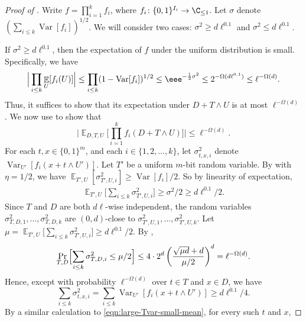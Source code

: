 \documentclass{toc}
\newcommand{\zo}{\{0,1\}}
\def\Blocklength{\ell}
\DeclareMathOperator*{\E}{\mathbb{E}}                 %
\DeclareMathOperator*{\Var}{Var}                 %
\begin{document}
  \begin{proof}[Proof of {}]
    Write $f = \prod_{i=1}^k f_i$, where $f_i\colon \zo^{I_i} \to \C_{\le 1}$.
    Let $\sigma$ denote $(\sum_{i \le k} \Var[f_i])^{1/2}$.
    We will consider two cases:  $\sigma^2 \ge d\Blocklength^{0.1}$ and $\sigma^2 \le d\Blocklength^{0.1}$.

    If $\sigma^2 \ge d\Blocklength^{0.1}$, then the expectation of $f$ under the uniform distribution is small.
		Specifically, we have
    \begin{align} \label{eqn:large-Tvar-small-mean}
      \Big| \prod_{i \le k} \E_{U}[f_i(U)] \Big|
      \le \prod_{i \le k} (1 - \Var[f_i])^{1/2} 
      \le \eee^{-\frac{1}{2} \sigma^2} 
      \le 2^{-\Omega(d\Blocklength^{0.1})}
      \le \Blocklength^{-\Omega(d)} .
		\end{align}
    Thus, it suffices to show that its expectation under $D + T \wedge U$ is at most $\Blocklength^{-\Omega(d)}$.
		We now use  to show that
    \[
      \Big| \E_{D,T,U} \Big[ \prod_{i=1}^k f_i(D + T \wedge U) \Big] \Big|
      \le \Blocklength^{-\Omega(d)} .
    \]
    For each $t, x \in \zo^m$, and each $i \in \{1, 2, \ldots, k\}$, let $\sigma_{t, x, i}^2$ denote $\Var_{U'} [f_i(x + t \wedge U')]$.
    Let $T'$ be a 
    uniform $m$-bit random variable.  
%
    By  with $\eta = 1/2$, we have $\E_{T',U}[ \sigma_{T',U,i}^2 ] \ge \Var[f_i] / 2$.
    So by linearity of expectation,
    \begin{align*}
      \E_{T',U} \Big[\sum_{i \le k} \sigma_{T',U,i}^2 \Big]
      \ge \sigma^2 / 2
      \ge d \Blocklength^{0.1} / 2 .
    \end{align*}
    Since $T$ and $D$ are both $d\Blocklength$-wise independent, the random variables
    $\sigma_{T,D,1}^2, \ldots, \sigma_{T,D,k}^2$ are $(0, d)$-close to $\sigma_{T',U,1}^2, \ldots, \sigma_{T',U,k}^2$.
    Let $\mu = \E_{T',U} \bigl[ \sum_{i \le k} \sigma_{T',U,i}^2 \bigr] \ge d \Blocklength^{0.1} / 2$.
    By ,
    \[
      \Pr_{T,D} \Bigl[ \sum_{i \le k} \sigma_{T,D,i}^2 \le \mu / 2 \Bigr]
      \le 4\cdot 2^d \left( \frac{\sqrt{\mu d} + d}{\mu / 2} \right)^d = \Blocklength^{-\Omega(d)} .
    \]
    Hence, except with probability $\Blocklength^{-\Omega(d)}$ over $t \in T$ and $x \in D$, we have
    \[
      \sum_{i \le k} \sigma_{t,x,i}^2
      = \sum_{i \le k} \Var_{U'}[f_i(x + t \wedge U')]
      \ge d\Blocklength^{0.1} / 4 .
    \]
    By a similar calculation to \eqref{eqn:large-Tvar-small-mean}, for every such $t$ and $x$,

\end{proof}
\end{document}
